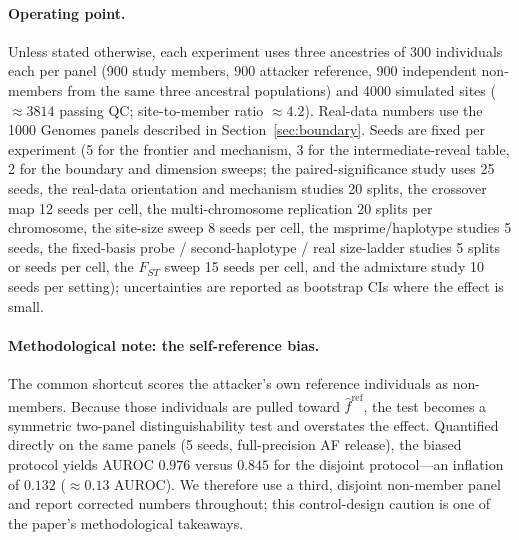 \documentclass[11pt]{article}
\begin{document}
\paragraph{Operating point.} Unless stated otherwise, each experiment uses three
ancestries of 300 individuals each per panel (900 study members, 900 attacker
reference, 900 independent non-members from the same three ancestral
populations) and 4000 simulated sites ($\approx 3814$ passing QC;
site-to-member ratio $\approx 4.2$). Real-data numbers use the 1000 Genomes
panels described in Section~\ref{sec:boundary}. Seeds are fixed per experiment
(5 for the frontier and mechanism, 3 for the intermediate-reveal table, 2 for
the boundary and dimension sweeps; the paired-significance study uses 25 seeds,
the real-data orientation and mechanism studies 20 splits, the crossover map
12 seeds per cell, the multi-chromosome replication 20 splits per chromosome,
the site-size sweep 8 seeds per cell, the msprime/haplotype studies 5 seeds, the
fixed-basis probe / second-haplotype / real size-ladder studies 5 splits or seeds
per cell, the
$F_{ST}$ sweep 15 seeds per cell, and the admixture study 10 seeds per setting);
uncertainties are reported as bootstrap CIs where the effect is small.

\paragraph{Methodological note: the self-reference bias.} The common shortcut
scores the attacker's own reference individuals as non-members. Because those
individuals are pulled toward $\hat f^{\text{ref}}$, the test becomes a
symmetric two-panel distinguishability test and overstates the effect. Quantified
directly on the same panels (5 seeds, full-precision AF release), the biased
protocol yields AUROC $0.976$ versus $0.845$ for the disjoint protocol---an
inflation of $0.132$ ($\approx 0.13$ AUROC). We therefore use a third, disjoint
non-member panel and report corrected numbers throughout; this control-design
caution is one of the paper's methodological takeaways.
\end{document}

